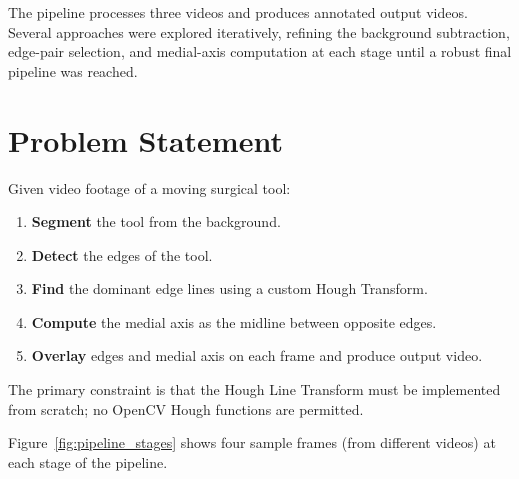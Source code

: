 \documentclass[conference, twocolumn]{IEEEtran}
\begin{document}
The pipeline processes three videos and produces annotated output videos. Several approaches were explored iteratively, refining the background subtraction, edge-pair selection, and medial-axis computation at each stage until a robust final pipeline was reached.

\section{Problem Statement}

Given video footage of a moving surgical tool:
\begin{enumerate}
    \item \textbf{Segment} the tool from the background.
    \item \textbf{Detect} the edges of the tool.
    \item \textbf{Find} the dominant edge lines using a custom Hough Transform.
    \item \textbf{Compute} the medial axis as the midline between opposite edges.
    \item \textbf{Overlay} edges and medial axis on each frame and produce output video.
\end{enumerate}

The primary constraint is that the Hough Line Transform must be implemented from scratch; no OpenCV Hough functions are permitted.

Figure~\ref{fig:pipeline_stages} shows four sample frames (from different videos) at each stage of the pipeline.
\end{document}
